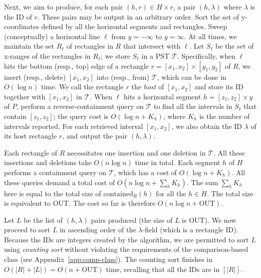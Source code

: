 \documentclass[sigconf]{acmart}
\def\vgap{\vspace{0mm}}
\def\T{\mathcal{T}}
\def\contained{\mathrm{contained}}
\def\out{\mathrm{OUT}}
\begin{document}
{{{%

\vgap

Next, we aim to produce, for each pair $(h, r) \in H \times r$, a pair $(h, \lambda)$ where $\lambda$ is the ID of $r$. These pairs may be output in an arbitrary order. Sort the set of y-coordinates defined by all the horizontal segments and rectangles. Sweep (conceptually) a horizontal line $\ell$ from $y = -\infty$ to $y = \infty$. At all times, we maintain the set $R_\ell$ of rectangles in $R$ that intersect with $\ell$. Let $S_\ell$ be the set of x-ranges of the rectangles in $R_\ell$; we store $S_\ell$ in a PST $\T$. Specifically, when $\ell$ hits the bottom (resp., top) edge of a rectangle $r = [x_1, x_2] \times [y_1, y_2]$ of $R$, we insert (resp., delete) $[x_1, x_2]$ into (resp., from) $\T$, which can be done in $O(\log n)$ time. We call the rectangle $r$ the {\em host} of $[x_1, x_2]$ and store its ID together with $[x_1, x_2]$ in $\T$. When $\ell$ hits a horizontal segment $h = [z_1, z_2] \times y$ of $P$, perform a reverse-containment query on $\T$ to find all the intervals in $S_\ell$ that contain $[z_1, z_2]$; the query cost is $O(\log n + K_h)$, where $K_h$ is the number of intervals reported. For each retrieved interval $[x_1, x_2]$, we also obtain the ID $\lambda$ of its host rectangle $r$, and output the pair $(h, \lambda)$.

\vgap

Each rectangle of $R$ necessitates one insertion and one deletion in $\T$. All these insertions and deletions take $O(n \log n)$ time in total. Each segment $h$ of $H$ performs a containment query on $\T$, which has a cost of $O(\log n + K_h)$. All these queries demand a total cost of $O(n \log n + \sum_h K_h)$. The sum $\sum_h K_h$ here is equal to the total size of $\contained_R(h)$ for all the $h \in H$. The total size is equivalent to $\out$. The cost so far is therefore $O(n \log n + \out)$.

\vgap

Let $L$ be the list of $(h, \lambda)$ pairs produced (the size of $L$ is $\out$). We now proceed to sort $L$ in ascending order of the $\lambda$-field (which is a rectangle ID). Because the IDs are integers created by the algorithm, we are permitted to sort $L$ using {\em counting sort} without violating the requirements of the comparison-based class (see Appendix~\ref{app:comp-class}). The counting sort finishes in $O(|R| + |L|) = O(n + \out)$ time, recalling that all the IDs are in $[|R|]$.

}}}
\end{document}
